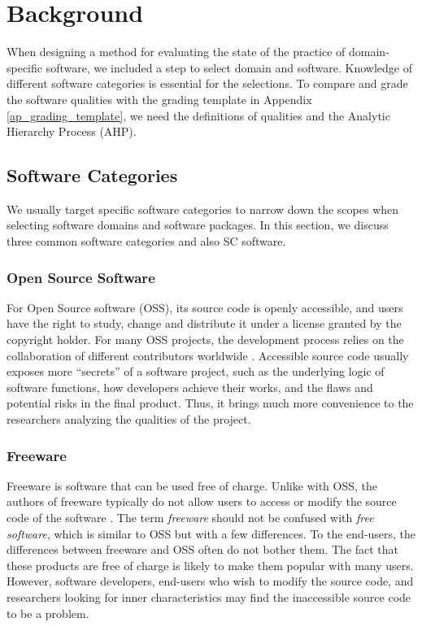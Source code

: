 \chapter{Background}
\label{ch_background}

When designing a method for evaluating the state of the practice of domain-specific software, we included a step to select domain and software. Knowledge of different software categories is essential for the selections. To compare and grade the software qualities with the grading template in Appendix \ref{ap_grading_template}, we need the definitions of qualities and the Analytic Hierarchy Process (AHP).

\section{Software Categories}
We usually target specific software categories to narrow down the scopes when selecting software domains and software packages. In this section, we discuss three common software categories and also SC software.

\subsection{Open Source Software}
\label{sec_open_source_software}
For Open Source software (OSS), its source code is openly accessible, and users have the right to study, change and distribute it under a license granted by the copyright holder. For many OSS projects, the development process relies on the collaboration of different contributors worldwide \cite{Corbly2014}. Accessible source code usually exposes more ``secrets'' of a software project, such as the underlying logic of software functions, how developers achieve their works, and the flaws and potential risks in the final product. Thus, it brings much more convenience to the researchers analyzing the qualities of the project.

\subsection{Freeware}
\label{sec_freeware}
Freeware is software that can be used free of charge. Unlike with OSS, the authors of freeware typically do not allow users to access or modify the source code of the software \cite{LINFO2006}. The term \textit{freeware} should not be confused with \textit{free software}, which is similar to OSS but with a few differences. To the end-users, the differences between freeware and OSS often do not bother them. The fact that these products are free of charge is likely to make them popular with many users. However, software developers, end-users who wish to modify the source code, and researchers looking for inner characteristics may find the inaccessible source code to be a problem. 

